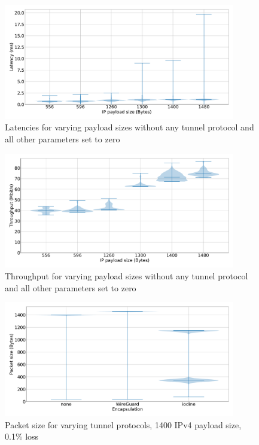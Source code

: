 \begin{figure}[t!]
	\centering
	\includegraphics[draft=false,width=0.9\textwidth]{figures/Graphs/graph-4-mtu/latencies.pdf}
	\caption{Latencies for varying payload sizes without any tunnel protocol and all other parameters set to zero}
	\label{fig:graph-4-mtu-latencies}
\end{figure}
\begin{figure}[t!]
	\centering
	\includegraphics[draft=false,width=0.9\textwidth]{figures/Graphs/graph-4-mtu/throughput.pdf}
	\caption{Throughput for varying payload sizes without any tunnel protocol and all other parameters set to zero}
	\label{fig:graph-4-mtu-throughput}
\end{figure}
\begin{figure}[t!]
	\centering
	\includegraphics[draft=false,width=0.9\textwidth]{figures/Graphs/graph-6-three-protocols/packet_size.pdf}
	\caption{Packet size for varying tunnel protocols, 1400 IPv4 payload size, 0.1\% loss}
	\label{fig:graph-6-three-protocols-size}
\end{figure}

